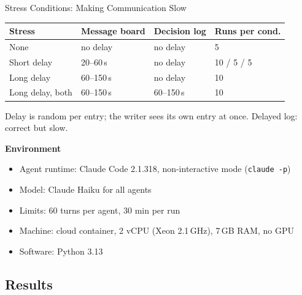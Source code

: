 \documentclass[aspectratio=169,11pt]{beamer}
\begin{document}
\begin{frame}{Stress Conditions: Making Communication Slow}
  \small
  \begin{tabular}{p{3.4cm}p{3.4cm}p{3.4cm}p{2.6cm}}
    \toprule
    Stress & Message board & Decision log & Runs per cond. \\
    \midrule
    None & no delay & no delay & 5 \\
    \leavevmode\pause Short delay & 20--60\,s & no delay & 10 / 5 / 5 \\
    \leavevmode\pause Long delay & 60--150\,s & no delay & 10 \\
    \leavevmode\pause Long delay, both & 60--150\,s & 60--150\,s & 10 \\
    \bottomrule
  \end{tabular}

  \vspace{0.6em}
  \pause\footnotesize
  Delay is random per entry; the writer sees its own entry at once. Delayed log: correct but slow.

  \vspace{0.4em}
  \textbf{Environment}
  \begin{itemize}\setlength{\itemsep}{0pt}
    \item Agent runtime: Claude Code 2.1.318, non-interactive mode (\texttt{claude -p})
    \item Model: Claude Haiku for all agents
    \item Limits: 60 turns per agent, 30 min per run
    \item Machine: cloud container, 2 vCPU (Xeon 2.1\,GHz), 7\,GB RAM, no GPU
    \item Software: Python 3.13
  \end{itemize}
\end{frame}


\subsection{Results}
\end{document}

